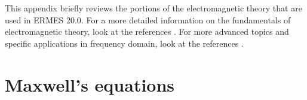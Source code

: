 %
%

This appendix briefly reviews the portions of the electromagnetic theory that are used in ERMES 20.0. For a more detailed information on the fundamentals of electromagnetic theory, look at the references \cite{Jackson, Griffiths, ProperTheory, LorrainCorson, Stratton, WangsnessIng, Ritz-MilfordIng}. For more advanced topics and specific applications in frequency domain, look at the references \cite{Balanis, HarringtonTime-Harmonic, Cessenat}.

\section{Maxwell's equations}

